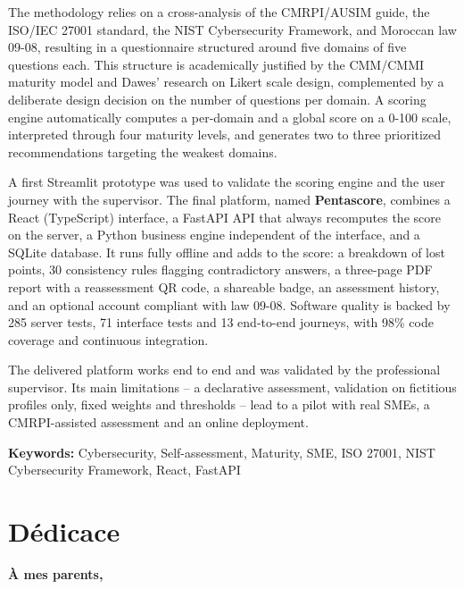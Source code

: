 \documentclass[12pt, a4paper, oneside]{report}
\begin{document}
The methodology relies on a cross-analysis of the CMRPI/AUSIM guide, the ISO/IEC 27001 standard, the NIST Cybersecurity Framework, and Moroccan law 09-08, resulting in a questionnaire structured around five domains of five questions each. This structure is academically justified by the CMM/CMMI maturity model and Dawes' research on Likert scale design, complemented by a deliberate design decision on the number of questions per domain. A scoring engine automatically computes a per-domain and a global score on a 0-100 scale, interpreted through four maturity levels, and generates two to three prioritized recommendations targeting the weakest domains.

A first Streamlit prototype was used to validate the scoring engine and the user journey with the supervisor. The final platform, named \textbf{Pentascore}, combines a React (TypeScript) interface, a FastAPI API that always recomputes the score on the server, a Python business engine independent of the interface, and a SQLite database. It runs fully offline and adds to the score: a breakdown of lost points, 30 consistency rules flagging contradictory answers, a three-page PDF report with a reassessment QR code, a shareable badge, an assessment history, and an optional account compliant with law 09-08. Software quality is backed by 285 server tests, 71 interface tests and 13 end-to-end journeys, with 98\% code coverage and continuous integration.

The delivered platform works end to end and was validated by the professional supervisor. Its main limitations -- a declarative assessment, validation on fictitious profiles only, fixed weights and thresholds -- lead to a pilot with real SMEs, a CMRPI-assisted assessment and an online deployment.

\vspace{6pt}
\textbf{Keywords:} Cybersecurity, Self-assessment, Maturity, SME, ISO 27001, NIST Cybersecurity Framework, React, FastAPI

\newpage


\chapter*{Dédicace}
\thispagestyle{empty}

\begin{center}
{\large\bfseries À mes parents,}
\end{center}
\end{document}
